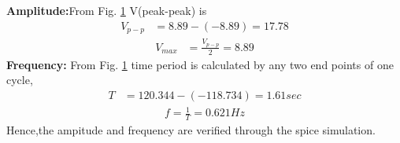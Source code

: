 \begin{enumerate}[label=\arabic*.,ref=\theenumi]
\begin{figure}[!ht]
\caption{}
\label{fig:ee18btech11047_spice2}
\end{figure}
\renewcommand{\thefigure}{\theenumi}
%
\textbf{Amplitude:}From Fig. \ref{fig:ee18btech11047_spice2} V(peak-peak) is 
\begin{align}
V_{p-p} &= 8.89-(-8.89)= 17.78
\end{align}
\begin{align}
V_{max} &= \frac{V_{p-p}}{2} = 8.89
\end{align}
\textbf{Frequency:} From Fig. \ref{fig:ee18btech11047_spice2} time period is calculated by any two end points of one cycle,
\begin{align}
T&=120.344-(-118.734) = 1.61 sec
\end{align}
\begin{align}
f = \frac{1}{T} = 0.621 Hz
\end{align}
Hence,the ampitude and frequency are verified through the spice simulation.
\end{enumerate}
